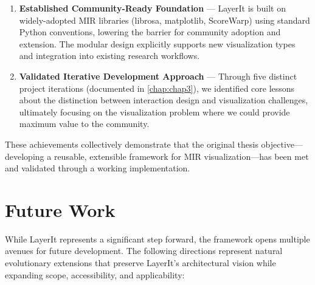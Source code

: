 \begin{enumerate}
\item \textbf{Established Community-Ready Foundation} — LayerIt is built on widely-adopted MIR libraries (librosa, matplotlib, ScoreWarp) using standard Python conventions, lowering the barrier for community adoption and extension. The modular design explicitly supports new visualization types and integration into existing research workflows.

\item \textbf{Validated Iterative Development Approach} — Through five distinct project iterations (documented in \autoref{chap:chap3}), we identified core lessons about the distinction between interaction design and visualization challenges, ultimately focusing on the visualization problem where we could provide maximum value to the community.

\end{enumerate}

These achievements collectively demonstrate that the original thesis objective—developing a reusable, extensible framework for MIR visualization—has been met and validated through a working implementation.


\section{Future Work}

While LayerIt represents a significant step forward, the framework opens multiple avenues for future development. The following directions represent natural evolutionary extensions that preserve LayerIt's architectural vision while expanding scope, accessibility, and applicability:

